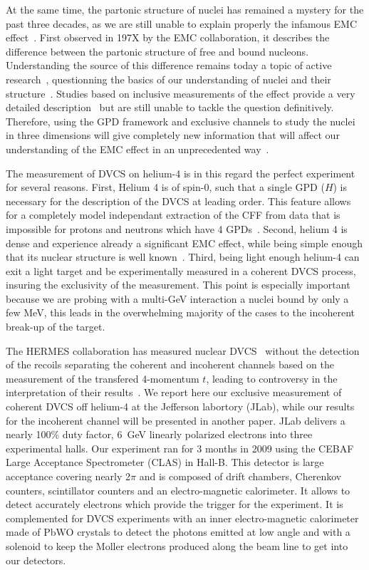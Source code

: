 \documentclass[%
 reprint,
 amsmath,amssymb,
 aps,
]{revtex4-1}
\begin{document}
At the same time, the partonic structure of nuclei has remained a mystery
for the past three decades, as we are still unable to explain properly the 
infamous EMC effect~\cite{}. First observed in 197X by the EMC 
collaboration, it describes the difference between the partonic structure of
free and bound nucleons. Understanding the source of this difference remains 
today a topic of active research~\cite{},
questionning the basics of our understanding of nuclei and their 
structure~\cite{}. Studies based on inclusive measurements of the
effect provide a very detailed description~\cite{} but 
are still unable to tackle the question definitively. Therefore,
using the GPD framework and exclusive channels to study the nuclei in three 
dimensions will give completely new information that will affect our understanding
of the EMC effect in an unprecedented way~\cite{}. 

The measurement of DVCS on helium-4 is in this regard the perfect experiment for
several reasons. First, Helium 4 is of spin-0, such that a single GPD ($H$) is
necessary for the description of the DVCS at leading order. This feature allows for a
completely model independant extraction of the CFF from data that is impossible for 
protons and neutrons which have 4 GPDs~\cite{}. Second, 
helium 4 is dense and experience 
already a significant EMC effect, while being simple enough that its nuclear
structure is well known~\cite{}. Third, being 
light enough helium-4 can exit
a light target and be experimentally measured in a coherent DVCS process, 
insuring the exclusivity of the 
measurement. This point is especially important because we are probing with a 
multi-GeV interaction a nuclei bound by only a few MeV, this leads in the 
overwhelming majority of the cases to the incoherent break-up of the target.

The HERMES collaboration has measured nuclear DVCS~\cite{} without the 
detection of the recoils separating the coherent and incoherent channels 
based on the measurement of the transfered 4-momentum $t$, leading
to controversy in the interpretation of their results~\cite{}. We report
here our exclusive measurement of coherent DVCS off helium-4 at the Jefferson labortory
(JLab), while our results for the incoherent channel will be presented in
another paper. JLab delivers a nearly 100\% duty factor, 6~GeV linearly 
polarized electrons into three experimental halls. Our experiment ran for 3 
months in 2009 using the CEBAF Large Acceptance Spectrometer (CLAS) in 
Hall-B. This detector is large acceptance covering nearly 2$\pi$ and is 
composed of drift chambers, Cherenkov counters, scintillator counters and 
an electro-magnetic calorimeter. It allows to detect accurately electrons 
which provide the trigger for the experiment. It is complemented for DVCS 
experiments with an inner electro-magnetic calorimeter made of PbWO crystals 
to detect the photons emitted at low angle and with a solenoid to keep the 
Moller electrons produced along the beam line to get into our detectors.
\end{document}

